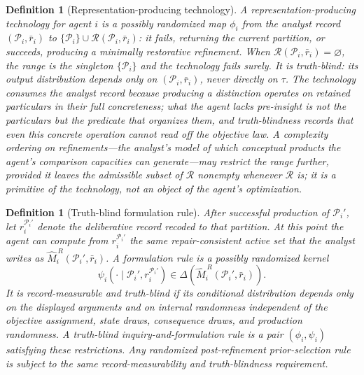 \documentclass[11pt]{article}
\newtheorem{definition}[assumption]{Definition}
\theoremstyle{definition}
\newcommand{\emptysetset}{\varnothing}
\begin{document}
\begin{definition}[Representation-producing technology]
\label{def:technology}
A representation-producing technology for agent $i$ is a possibly randomized map $\phi_i$ from the analyst record $(\mathcal P_i,\bar r_i)$ to $\{\mathcal P_i\}\cup\mathcal R(\mathcal P_i,\bar r_i)$: it fails, returning the current partition, or succeeds, producing a minimally restorative refinement.
When $\mathcal R(\mathcal P_i,\bar r_i)=\emptysetset$, the range is the singleton $\{\mathcal P_i\}$ and the technology fails surely.
It is \emph{truth-blind}: its output distribution depends only on $(\mathcal P_i,\bar r_i)$, never directly on $\tau$.
The technology consumes the analyst record because producing a distinction operates on retained particulars in their full concreteness; what the agent lacks pre-insight is not the particulars but the predicate that organizes them, and truth-blindness records that even this concrete operation cannot read off the objective law.
A complexity ordering on refinements---the analyst's model of which conceptual products the agent's comparison capacities can generate---may restrict the range further, provided it leaves the admissible subset of $\mathcal R$ nonempty whenever $\mathcal R$ is; it is a primitive of the technology, not an object of the agent's optimization.
\end{definition}

\begin{definition}[Truth-blind formulation rule]
\label{def:formulation-rule}
After successful production of $\mathcal P_i'$, let $r_i^{\mathcal P_i'}$ denote the deliberative record recoded to that partition.
At this point the agent can compute from $r_i^{\mathcal P_i'}$ the same repair-consistent active set that the analyst writes as $\widehat M_i^{\,R}(\mathcal P_i',\bar r_i)$.
A \emph{formulation rule} is a possibly randomized kernel
\[
\psi_i\!\left(
\cdot\mid\mathcal P_i',r_i^{\mathcal P_i'}
\right)
\in
\Delta\!\left(
\widehat M_i^{\,R}(\mathcal P_i',\bar r_i)
\right).
\]
It is \emph{record-measurable and truth-blind} if its conditional distribution depends only on the displayed arguments and on internal randomness independent of the objective assignment, state draws, consequence draws, and production randomness.
A \emph{truth-blind inquiry-and-formulation rule} is a pair $(\phi_i,\psi_i)$ satisfying these restrictions.
Any randomized post-refinement prior-selection rule is subject to the same record-measurability and truth-blindness requirement.
\end{definition}
\end{document}
